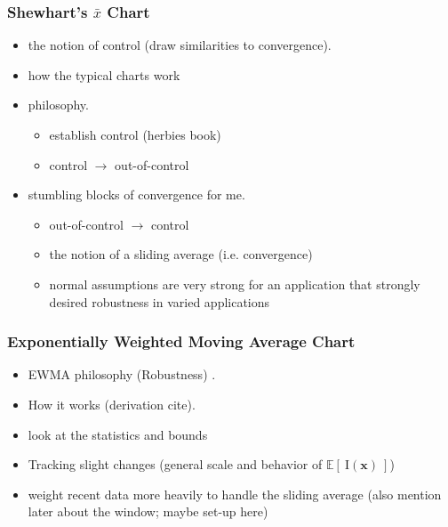\documentclass[12pt]{article}
\def \EIx {
	\mathbb{E}\left[~\text{I}(\bm{x})~\right]
}
\begin{document}
		\subsubsection{Shewhart's $\bar{x}$ Chart}
		\begin{itemize}
		\item the notion of control (draw similarities to convergence). \cite{shewhartBook}
		\item how the typical charts work
		\item philosophy.
			\begin{itemize}
			\item establish control (herbies book)
			\item control $\rightarrow$ out-of-control 
			\end{itemize}
		\item stumbling blocks of convergence for me.
			\begin{itemize}
			\item out-of-control $\rightarrow$ control
			\item the notion of a sliding average (i.e. convergence)
			\item normal assumptions are very strong for an application that strongly desired robustness in varied applications%
			\end{itemize}
		\end{itemize}
		\subsubsection{Exponentially Weighted Moving Average Chart}
		\begin{itemize}
		\item EWMA philosophy (Robustness) \cite{boxBook}.
		\item How it works ({\color{red}derivation cite}).
		\item look at the statistics and bounds
		\item Tracking slight changes (general scale and behavior of $\EIx$) 
		\item weight recent data more heavily to handle the sliding average (also mention later about the window; maybe set-up here)%
		\end{itemize}
\end{document}
